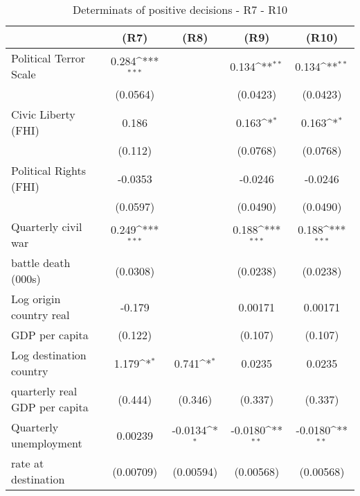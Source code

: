 \begin{table}[htbp]\centering \scriptsize
\def\sym#1{\ifmmode^{#1}\else\(^{#1}\)\fi}
\caption{Determinats of positive decisions - R7 - R10}
\begin{tabular}{l*{4}{c}}
\hline\hline
                    &\multicolumn{1}{c}{(R7)}&\multicolumn{1}{c}{(R8)}&\multicolumn{1}{c}{(R9)}&\multicolumn{1}{c}{(R10)}\\
\hline
Political Terror Scale&       0.284\sym{***}&                     &       0.134\sym{**} &       0.134\sym{**} \\
                    &    (0.0564)         &                     &    (0.0423)         &    (0.0423)         \\
[0,5em]
Civic Liberty (FHI) &       0.186         &                     &       0.163\sym{*}  &       0.163\sym{*}  \\
                    &     (0.112)         &                     &    (0.0768)         &    (0.0768)         \\
[0,5em]
Political Rights (FHI)&     -0.0353         &                     &     -0.0246         &     -0.0246         \\
                    &    (0.0597)         &                     &    (0.0490)         &    (0.0490)         \\
[0,5em]
Quarterly civil war &       0.249\sym{***}&                     &       0.188\sym{***}&       0.188\sym{***}\\
battle death (000s)                    &    (0.0308)         &                     &    (0.0238)         &    (0.0238)         \\
[0,5em]
Log origin country real&      -0.179         &                     &     0.00171         &     0.00171         \\
 GDP per capita                    &     (0.122)         &                     &     (0.107)         &     (0.107)         \\
[0,5em]
Log destination country&       1.179\sym{*}  &       0.741\sym{*}  &      0.0235         &      0.0235         \\
 quarterly real GDP per capita                    &     (0.444)         &     (0.346)         &     (0.337)         &     (0.337)         \\
[0,5em]
Quarterly unemployment &     0.00239         &     -0.0134\sym{*}  &     -0.0180\sym{**} &     -0.0180\sym{**} \\
rate at destination                    &   (0.00709)         &   (0.00594)         &   (0.00568)         &   (0.00568)         \\

\end{tabular}
\end{table}

